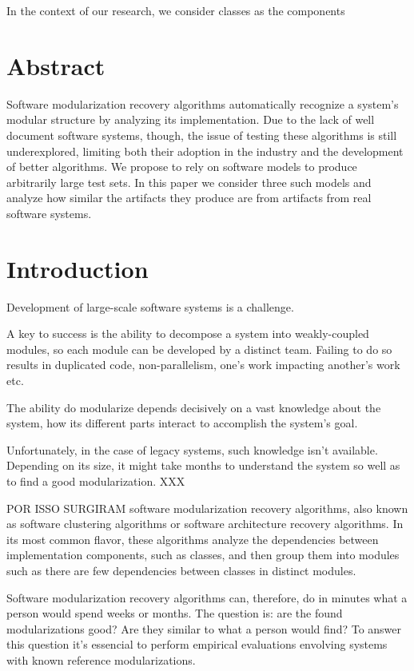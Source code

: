 In the context of our research, we consider classes as the components

\section{Abstract}

Software modularization recovery algorithms automatically recognize a system's
modular structure by analyzing its implementation.
Due to the lack of well document software systems, though, the issue of testing
these algorithms is still underexplored, limiting both their adoption in the
industry and the development of better algorithms.
We propose to rely on software models to produce arbitrarily large test sets. In
this paper we consider three such models and analyze how similar the artifacts
they produce are from artifacts from real software systems.
\cite{Pollet2007}

\section{Introduction}

Development of large-scale software systems is a challenge.

A key to success is the ability to decompose a system into weakly-coupled
modules, so each module can be developed by a distinct team. Failing to do so
results in duplicated code, non-parallelism, one's work impacting another's work
etc.

The ability do modularize depends decisively on a vast knowledge about the
system, how its different parts interact to accomplish the system's goal.

Unfortunately, in the case of legacy systems, such knowledge isn't available.
Depending on its size, it might take months to understand the system so well as
to find a good modularization. XXX \cite{Parnas1972}

POR ISSO SURGIRAM software modularization recovery algorithms, also known as
software clustering algorithms or software architecture recovery algorithms. In
its most common flavor, these algorithms analyze the dependencies between
implementation components, such as classes, and then group them into modules
such as there are few dependencies between classes in distinct modules.

Software modularization recovery algorithms can, therefore, do in minutes what a
person would spend weeks or months. The question is: are the found
modularizations good? Are they similar to what a person would find? To answer
this question it's essencial to perform empirical evaluations envolving systems
with known reference modularizations.

